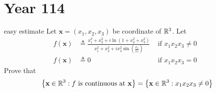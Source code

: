 \documentclass{report}
\begin{document}
\section{Year 114}
\begin{question}{easy estimate}{}
Let $\textbf{x}=(x_1,x_2,x_3)$ be coordinate of $\mathbb{R}^3$. Let 
\begin{align*}
  f(\textbf{x})&\triangleq  \frac{x_1^3+x_2^2+i \ln (1+x_2^2+ x_3^2)}{x_1^2+x_2^2+i x_3^2 \sin \left( \frac{x_1}{x_3} \right)} &\text{ if $x_1x_2x_3\neq 0$ }\\
  f(\textbf{x})&\triangleq  0  &\text{ if }x_1x_2x_3=0
\end{align*}
Prove that 
\begin{align*}
\left\{ \textbf{x}\in\mathbb{R}^3:f\text{ is continuous at }\textbf{x} \right\}=\left\{ \textbf{x}\in\mathbb{R}^3:x_1x_2x_3\neq 0 \right\}
\end{align*}
\end{question}
\end{document}
